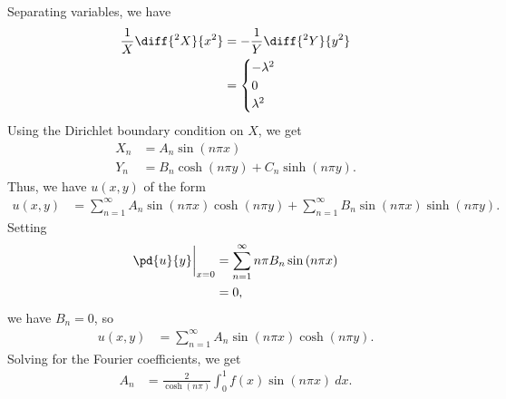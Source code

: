 \documentclass[10pt]{mypackage}
\begin{document}
\begin{solution}[12.5, Problem 8]
  Separating variables, we have
  \begin{align*}
    \frac{1}{X}\diff{^2X}{x^2} &= -\frac{1}{Y}\diff{^2Y}{y^2}\\
                               &= \begin{cases}
                                 -\lambda^2\\
                                 0\\
                                 \lambda^2
                               \end{cases}
  \end{align*}
  Using the Dirichlet boundary condition on $X$, we get
  \begin{align*}
    X_n &= A_n\sin\left( n\pi x \right)\\
    Y_n &= B_n\cosh\left( n\pi y \right) + C_n\sinh\left( n\pi y \right).
  \end{align*}
  Thus, we have $u\left( x,y \right)$ of the form
  \begin{align*}
    u\left( x,y \right) &= \sum_{n=1}^{\infty}A_n\sin\left( n\pi x \right)\cosh\left( n\pi y \right) + \sum_{n=1}^{\infty}B_n\sin\left( n\pi x \right)\sinh\left( n\pi y \right).
  \end{align*}
  Setting
  \begin{align*}
    \pd{u}{y}\biggr\vert_{x=0} &= \sum_{n=1}^{\infty} n\pi B_n\sin\left( n\pi x \right)\\
                               &= 0,
  \end{align*}
  we have $B_n = 0$, so
  \begin{align*}
    u\left( x,y \right) &= \sum_{n=1}^{\infty}A_n\sin\left( n\pi x \right)\cosh\left( n\pi y \right).
  \end{align*}
  Solving for the Fourier coefficients, we get
  \begin{align*}
    A_n &= \frac{2}{\cosh\left( n\pi \right)} \int_{0}^{1} f(x)\sin\left( n\pi x \right)\:dx.
  \end{align*}
\end{solution}
\end{document}
